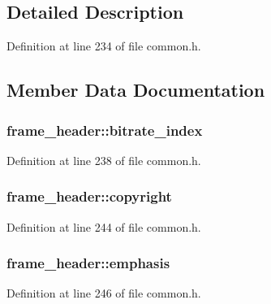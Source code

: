\subsection{Detailed Description}


Definition at line 234 of file common.\+h.



\subsection{Member Data Documentation}
\subsubsection[{\texorpdfstring{bitrate\+\_\+index}{bitrate_index}}]{ frame\+\_\+header\+::bitrate\+\_\+index}\hypertarget{structframe__header_ad219005f5e70c73d083bfcc7f88dadaa}{}\label{structframe__header_ad219005f5e70c73d083bfcc7f88dadaa}


Definition at line 238 of file common.\+h.

\subsubsection[{\texorpdfstring{copyright}{copyright}}]{ frame\+\_\+header\+::copyright}\hypertarget{structframe__header_a096ededb94b3b7984c75b15c8f9cfe9f}{}\label{structframe__header_a096ededb94b3b7984c75b15c8f9cfe9f}


Definition at line 244 of file common.\+h.

\subsubsection[{\texorpdfstring{emphasis}{emphasis}}]{ frame\+\_\+header\+::emphasis}\hypertarget{structframe__header_ab703f3bb552285c732464b3c0d7a1c52}{}\label{structframe__header_ab703f3bb552285c732464b3c0d7a1c52}


Definition at line 246 of file common.\+h.

